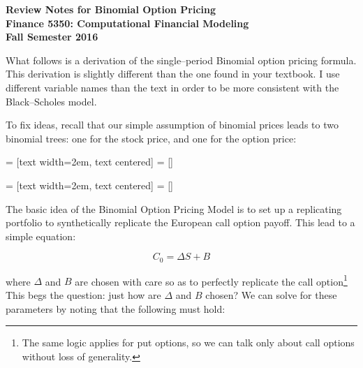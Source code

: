 \documentclass[11pt]{article}
\begin{document}
\textbf{Review Notes for Binomial Option Pricing} \\
\textbf{Finance 5350: Computational Financial Modeling} \\
\textbf{Fall Semester 2016} \\
\vspace{5mm}

\bigskip
What follows is a derivation of the single--period Binomial option pricing formula.
This derivation is slightly different than the one found in your textbook.  I use different variable names than the text in order
to be more consistent with the Black--Scholes model.


\vspace{5mm}
To fix ideas, recall that our simple assumption of binomial prices leads to two
binomial trees: one for the stock price, and one for the option price:

\vspace{10mm}
\begin{center}
 = [text width=2em, text centered]
 = []
\end{center}

\vspace{10mm}
\begin{center}
 = [text width=2em, text centered]
 = []
\end{center}

\medskip
The basic idea of the Binomial Option Pricing Model is to set up a replicating portfolio to synthetically
replicate the European call option payoff. This lead to a simple equation:

\medskip
\begin{equation*}
C_{0} = \Delta S + B
\end{equation*}

\medskip
where $\Delta$ and $B$ are chosen with care so as to perfectly replicate the call option\footnote{The same logic
applies for put options, so we can talk only about call options without loss of generality.} This begs the
question: just how are $\Delta$ and $B$ chosen? We can solve for these parameters by noting that the following
must hold:
\end{document}
